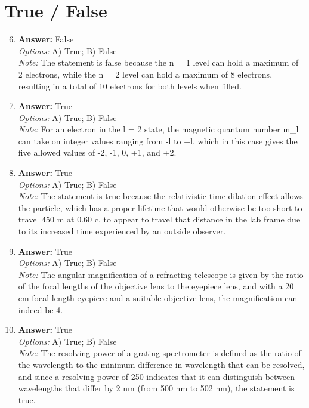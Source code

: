 \documentclass[12pt]{article}
\begin{document}
\section*{True / False}
\begin{enumerate}[label=\arabic*.]
\setcounter{enumi}{5}
\item \textbf{Answer:} False
\\ \textit{Options:} A) True; B) False
\\ \textit{Note:} The statement is false because the n = 1 level can hold a maximum of 2 electrons, while the n = 2 level can hold a maximum of 8 electrons, resulting in a total of 10 electrons for both levels when filled.
\item \textbf{Answer:} True
\\ \textit{Options:} A) True; B) False
\\ \textit{Note:} For an electron in the l = 2 state, the magnetic quantum number m\_l can take on integer values ranging from -l to +l, which in this case gives the five allowed values of -2, -1, 0, +1, and +2.
\item \textbf{Answer:} True
\\ \textit{Options:} A) True; B) False
\\ \textit{Note:} The statement is true because the relativistic time dilation effect allows the particle, which has a proper lifetime that would otherwise be too short to travel 450 m at 0.60 c, to appear to travel that distance in the lab frame due to its increased time experienced by an outside observer.
\item \textbf{Answer:} True
\\ \textit{Options:} A) True; B) False
\\ \textit{Note:} The angular magnification of a refracting telescope is given by the ratio of the focal lengths of the objective lens to the eyepiece lens, and with a 20 cm focal length eyepiece and a suitable objective lens, the magnification can indeed be 4.
\item \textbf{Answer:} True
\\ \textit{Options:} A) True; B) False
\\ \textit{Note:} The resolving power of a grating spectrometer is defined as the ratio of the wavelength to the minimum difference in wavelength that can be resolved, and since a resolving power of 250 indicates that it can distinguish between wavelengths that differ by 2 nm (from 500 nm to 502 nm), the statement is true.
\end{enumerate}
\end{document}
